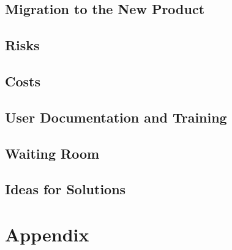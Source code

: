 \documentclass{article}
\begin{document}
\subsection{Migration to the New Product}

\subsection{Risks}

\subsection{Costs}

\subsection{User Documentation and Training}

\subsection{Waiting Room}

\subsection{Ideas for Solutions}





\newpage

\section{Appendix}
\end{document}

